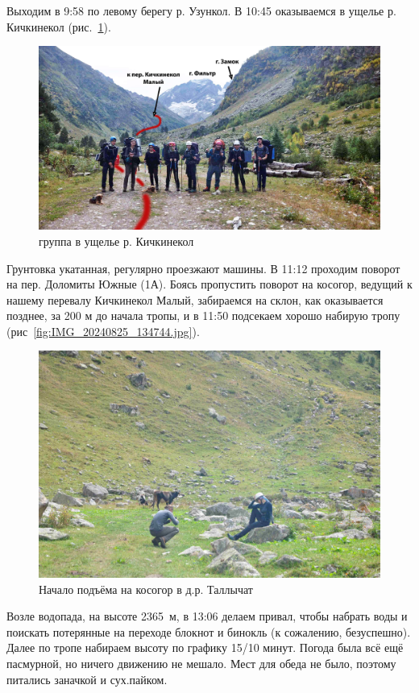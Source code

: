 Выходим в 9:58 по левому берегу р. Узункол. В 10:45 оказываемся в ущелье р. Кичкинекол (рис.~\ref{fig:DSC_0127.JPG}). 

\begin{figure}[h!]
	\centering
	\includegraphics[width=0.7\linewidth]{../pics/DSC_0127.jpg}
	\caption{группа в ущелье р. Кичкинекол}
	\label{fig:DSC_0127.JPG}
\end{figure}


Грунтовка укатанная, регулярно проезжают машины.  В 11:12 проходим поворот на пер. Доломиты Южные (1А). Боясь пропустить поворот на косогор, ведущий к нашему перевалу Кичкинекол Малый, забираемся на склон, как оказывается позднее, за 200 м до начала тропы, и в 11:50 подсекаем хорошо набирую тропу (рис~\ref{fig:IMG_20240825_134744.jpg}).  
	
	\begin{figure}[h!]
		\centering
		\includegraphics[width=0.7\linewidth]{../pics/DSC_0138.jpg}
		\caption{Начало подъёма на косогор в д.р. Таллычат}
		\label{fig:DSC_0138.JPG}
	\end{figure}
	
	Возле водопада, на высоте 2365~м, в 13:06 делаем привал, чтобы набрать воды и поискать потерянные на переходе блокнот и бинокль (к сожалению, безуспешно). Далее по тропе набираем высоту по графику 15/10 минут. Погода была всё ещё пасмурной, но ничего движению не мешало. Мест для обеда не было, поэтому питались заначкой и сух.пайком.

